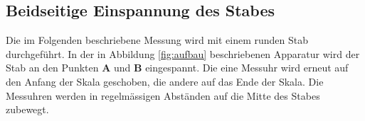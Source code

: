 \subsection{Beidseitige Einspannung des Stabes}
Die im Folgenden beschriebene Messung wird mit einem runden Stab durchgeführt.
In der in Abbildung \ref{fig:aufbau} beschriebenen Apparatur wird der Stab an den
Punkten \textbf{A} und \textbf{B} eingespannt. Die eine Messuhr wird erneut auf den
Anfang der Skala geschoben, die andere auf das Ende der Skala. Die Messuhren werden
in regelmässigen Abständen auf die Mitte des Stabes zubewegt.
